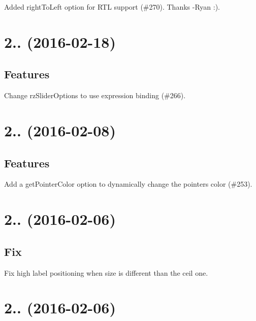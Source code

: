 \begin{DoxyItemize}
\item Added {\ttfamily right\+To\+Left} option for R\+TL support (\#270). Thanks -\/\+Ryan \+:).
\end{DoxyItemize}

\section*{2.. (2016-\/02-\/18)}

\subsection*{Features}


\begin{DoxyItemize}
\item Change {\ttfamily rz\+Slider\+Options} to use expression binding (\#266).
\end{DoxyItemize}

\section*{2.. (2016-\/02-\/08)}

\subsection*{Features}


\begin{DoxyItemize}
\item Add a {\ttfamily get\+Pointer\+Color} option to dynamically change the pointers color (\#253).
\end{DoxyItemize}

\section*{2.. (2016-\/02-\/06)}

\subsection*{Fix}


\begin{DoxyItemize}
\item Fix high label positioning when size is different than the ceil one.
\end{DoxyItemize}

\section*{2.. (2016-\/02-\/06)}

